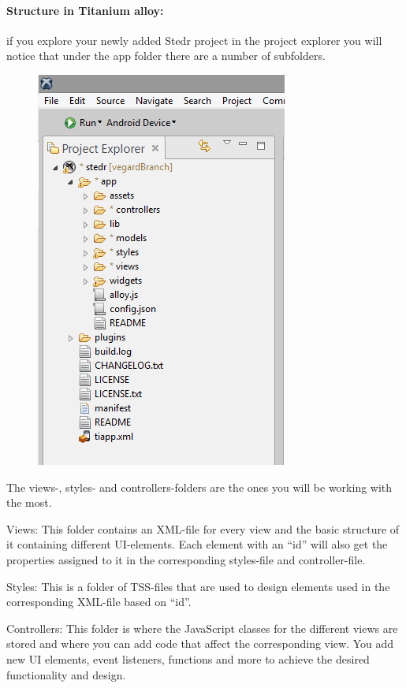 \paragraph{Structure in Titanium alloy:}
if you explore your newly added Stedr project in the project explorer you will notice that under the app folder there are a number of subfolders.

\begin{figure}
\begin{center}
\includegraphics[scale=0.45]{guide/f5.png} 
\end{center}
\end{figure}

The views-, styles- and controllers-folders are the ones you will be working with the most.

Views:
This folder contains an XML-file for every view and the basic structure of it containing different UI-elements. Each element with an “id” will also get the properties assigned to it in the corresponding styles-file and controller-file.

Styles:
This is a folder of TSS-files that are used to design elements used in the corresponding XML-file based on “id”.

Controllers:
This folder is where the JavaScript classes for the different views are stored and where you can add code that affect the corresponding view. You add new UI elements,  event listeners, functions and more to achieve the desired functionality and design.


